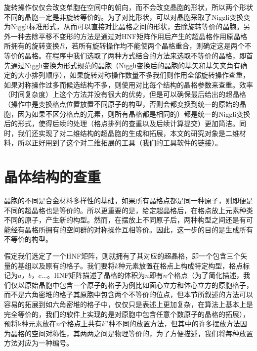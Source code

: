 旋转操作仅仅会改变单胞在空间中的朝向，而不会改变晶胞的形状，所以两个形状不同的晶胞一定是非旋转等价的。为了对比形状，可以对晶胞采取了Niggli变换\cite{kvrivy1976unified,grosse2004numerically}变为Niggli标准形式，从而可以直接对比晶格之间的形状，去除旋转等价的晶胞。另外一种去除平移不变形的方法\cite{hart2008algorithm}是通过对HNF矩阵作用后产生的超晶格作用原晶格所拥有的旋转变换$R$，若所有旋转操作均不能使两个晶格重合，则确定这是两个不等价的晶格。在程序中我们选取了两种方式结合的方法来选取不等价的晶格，即首先通过Niggli变换为形式规范的晶胞（Niggli变换后的晶胞的基矢和基矢夹角有确定的大小排列顺序），如果旋转对称操作数量不多我们则作用全部旋转操作查重，如果对称操作过多而候选结构不多，则使用对比每个结构的晶格参数来查重。效率（时间复杂度）上这个方法并没有很大的优势，但是可以确保最后给出的超晶格（操作中是变换格点位置放置不同原子的构型，否则会都变换到统一的原始的晶胞，因为如果不区分格点的元素，则所有晶格都是相同的）都是统一的Niggli变换后的形式，使得后续的处理（格点排列的查重以及后续计算提交）更加简洁。同时，我们还实现了对二维结构的超晶胞的生成和拓展，本文的研究对象是二维材料，所以正好用到了这个对二维拓展的工具（我们的工具软件的链接\cite{pniggli}）。

\section{晶体结构的查重}
晶胞的不同是合金材料多样性的基础，如果所有晶格点都是同一种原子，则即便是不同的超晶格也是等价的。所以更重要的是，给定超晶格后，在格点放上元素种类不同的原子，产生新的构型。然而，在摆放上不同原子后，两种构型之间还是有可能经有晶格所拥有的空间群的对称操作互相等价。因此，这一步的目的是生成所有不等价的构型。

假定我们选定了一个HNF矩阵，则就拥有了其对应的超晶格，即一个包含三个矢量的基组以及原有的格子。我们要将$k$种元素放置在格点上构成特定构型，格点标记为$a$，$b$，$c$...。HNF矩阵描述了晶格的体积为$n$即有$n$个格点（为了简化描述，我们仅以原始晶胞中包含一个原子的格子为例比如面心立方和体心立方的原胞格子，而不是六角密堆的格子其原胞中包含两个不等价的位点，但本节所叙述的方法可以容易的拓展到如六角密堆的格子中，仅仅只是表述上更加复杂，在算法上基本上是完全等价的，我们的软件上实现的是对原胞中包含任意个数原子的晶格的拓展），预将k种元素放在$n$个格点上共有$k^n$种不同的放置方法，但其中的许多摆放方法因为晶格的空间对称性，其两两之间是物理等价的，为了方便描述，我们将每种放置方法对应为一种编号。


